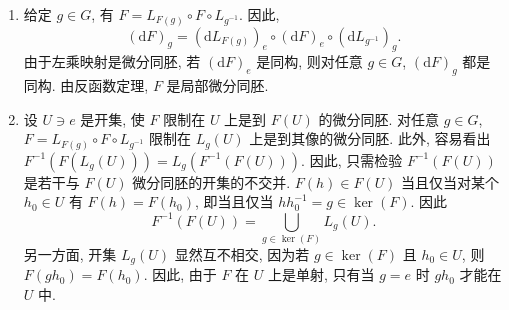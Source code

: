 \begin{description}[font=\normalfont,leftmargin=2em,labelwidth=1.5em]
\begin{enumerate}[label=(\alph*),ref=\alph*,leftmargin=*]
设 $V,W\in\mathfrak{g}$. 则
\begin{align*}
  (\mathrm{d}F)_e[V,W]&=(\mathrm{d}F)_e[X^V,X^W]_e=(F_*[X^V,X^W])_e\\
  &=[F_*X^V,F_*X^W]_e=[X^{(\mathrm{d}F)_eV},X^{(\mathrm{d}F)_eW}]_e\\
  &=[(\mathrm{d}F)_eV,(\mathrm{d}F)_eW].
\end{align*}
这里使用了 Exercise~\ref{ex:vector-fields}(\ref{ex:pushforward-preserves-lie-bracket}) 的结论, 它很容易推广到任意可微映射.
\item 给定 $g\in G$, 有 $F=L_{F(g)}\circ F\circ L_{g^{-1}}$. 因此,
\[
  (\mathrm{d}F)_g=(\mathrm{d}L_{F(g)})_e\circ(\mathrm{d}F)_e\circ(\mathrm{d}L_{g^{-1}})_g.
\]
由于左乘映射是微分同胚, 若 $(\mathrm{d}F)_e$ 是同构, 则对任意 $g\in G$, $(\mathrm{d}F)_g$ 都是同构. 由反函数定理, $F$ 是局部微分同胚.
\item 设 $U\ni e$ 是开集, 使 $F$ 限制在 $U$ 上是到 $F(U)$ 的微分同胚. 对任意 $g\in G$, $F=L_{F(g)}\circ F\circ L_{g^{-1}}$ 限制在 $L_g(U)$ 上是到其像的微分同胚. 此外, 容易看出 $F^{-1}(F(L_g(U)))=L_g(F^{-1}(F(U)))$. 因此, 只需检验 $F^{-1}(F(U))$ 是若干与 $F(U)$ 微分同胚的开集的不交并. $F(h)\in F(U)$ 当且仅当对某个 $h_0\in U$ 有 $F(h)=F(h_0)$, 即当且仅当 $hh_0^{-1}=g\in\ker(F)$. 因此
\[
  F^{-1}(F(U))=\bigcup_{g\in\ker(F)}L_g(U).
\]
另一方面, 开集 $L_g(U)$ 显然互不相交, 因为若 $g\in\ker(F)$ 且 $h_0\in U$, 则 $F(gh_0)=F(h_0)$. 因此, 由于 $F$ 在 $U$ 上是单射, 只有当 $g=e$ 时 $gh_0$ 才能在 $U$ 中.
\end{enumerate}
\end{description}
